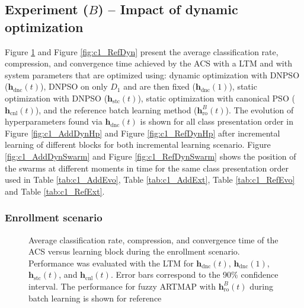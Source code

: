 \subsection{Experiment ($B$) -- Impact of dynamic optimization}

Figure \ref{fig:c1_AddDyn} and Figure \ref{fig:c1_RefDyn} present the average classification rate, compression, and convergence time achieved by the ACS with a LTM and with system parameters that are optimized using: dynamic optimization with DNPSO ($\textbf{h}_\text{dnc}(t)$), DNPSO on only $D_1$ and are then fixed ($\textbf{h}_\text{dnc}(1)$), static optimization with DNPSO ($\textbf{h}_\text{stc}(t)$), static optimization with canonical PSO ($\textbf{h}_\text{cnl}(t)$), and the reference batch learning method ($\textbf{h}_\text{ro}^B(t)$). The evolution of hyperparameters found via $\textbf{h}_\text{dnc}(t)$ is shown for all class presentation order in Figure \ref{fig:c1_AddDynHp} and Figure \ref{fig:c1_RefDynHp} after incremental learning of different blocks for both incremental learning scenario. Figure \ref{fig:c1_AddDynSwarm} and Figure \ref{fig:c1_RefDynSwarm} shows the position of the swarms at different moments in time for the same class presentation order used in Table \ref{tab:c1_AddEvo}, Table \ref{tab:c1_AddExt}, Table \ref{tab:c1_RefEvo} and Table \ref{tab:c1_RefExt}.

\subsubsection{Enrollment scenario}

\begin{figure}[!b]
  \centering
  \caption{Average classification rate, compression, and convergence time of the ACS versus learning block during the enrollment scenario. Performance was evaluated with the LTM for $\textbf{h}_\text{dnc}(t)$, $\textbf{h}_\text{dnc}(1)$, $\textbf{h}_\text{stc}(t)$, and $\textbf{h}_\text{cnl}(t)$. Error bars correspond to the 90\% confidence interval. The performance for fuzzy ARTMAP with $\textbf{h}_\text{ro}^B(t)$ during batch learning is shown for reference}
	\label{fig:c1_AddDyn}
\end{figure}

